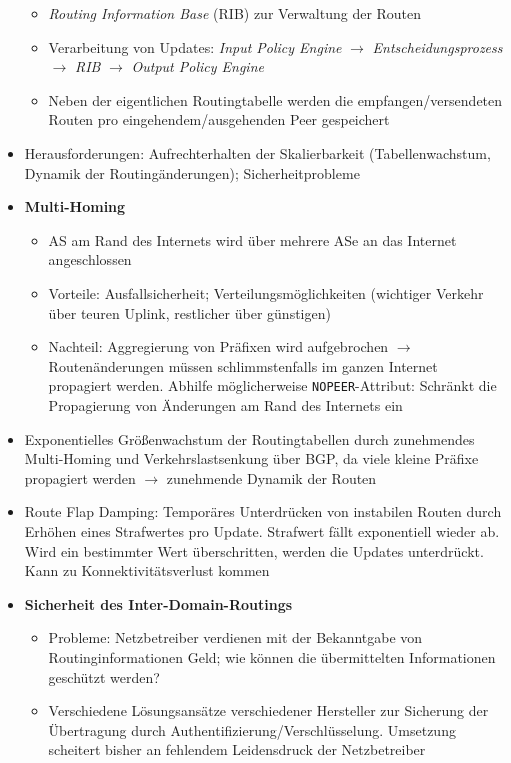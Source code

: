\begin{itemize}
\begin{itemize}
		\item \textit{Routing Information Base} (RIB) zur Verwaltung der Routen
		\item Verarbeitung von Updates: \textit{Input Policy Engine} \(\rightarrow\) \textit{Entscheidungsprozess} \(\rightarrow\) \textit{RIB} \(\rightarrow\) \textit{Output Policy Engine}
		\item Neben der eigentlichen Routingtabelle werden die empfangen/versendeten Routen pro eingehendem/ausgehenden Peer gespeichert
	\end{itemize}
	\item Herausforderungen: Aufrechterhalten der Skalierbarkeit (Tabellenwachstum, Dynamik der Routingänderungen); Sicherheitprobleme
	\item \textbf{Multi-Homing}
	\begin{itemize}
		\item AS am Rand des Internets wird über mehrere ASe an das Internet angeschlossen
		\item Vorteile: Ausfallsicherheit; Verteilungsmöglichkeiten (wichtiger Verkehr über teuren Uplink, restlicher über günstigen)
		\item Nachteil: Aggregierung von Präfixen wird aufgebrochen \(\rightarrow\) Routenänderungen müssen schlimmstenfalls im ganzen Internet propagiert werden. Abhilfe möglicherweise \texttt{NOPEER}-Attribut: Schränkt die Propagierung von Änderungen am Rand des Internets ein
	\end{itemize}
	\item Exponentielles Größenwachstum der Routingtabellen durch zunehmendes Multi-Homing und Verkehrslastsenkung über BGP, da viele kleine Präfixe propagiert werden \(\rightarrow\) zunehmende Dynamik der Routen
	\item Route Flap Damping: Temporäres Unterdrücken von instabilen Routen durch Erhöhen eines Strafwertes pro Update. Strafwert fällt exponentiell wieder ab. Wird ein bestimmter Wert überschritten, werden die Updates unterdrückt. Kann zu Konnektivitätsverlust kommen
	\item \textbf{Sicherheit des Inter-Domain-Routings}
	\begin{itemize}
		\item Probleme: Netzbetreiber verdienen mit der Bekanntgabe von Routinginformationen Geld; wie können die übermittelten Informationen geschützt werden?
		\item Verschiedene Lösungsansätze verschiedener Hersteller zur Sicherung der Übertragung durch Authentifizierung/Verschlüsselung. Umsetzung scheitert bisher an fehlendem Leidensdruck der Netzbetreiber

\end{itemize}
\end{itemize}
